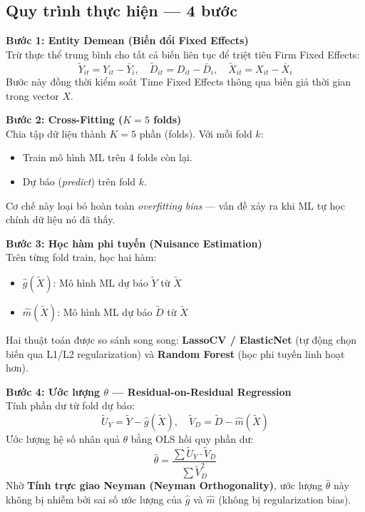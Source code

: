 \documentclass[12pt,a4paper]{article}
\begin{document}
\subsection{Quy trình thực hiện --- 4 bước}
\textbf{Bước 1: Entity Demean (Biến đổi Fixed Effects)} \\
Trừ thực thể trung bình cho tất cả biến liên tục để triệt tiêu Firm Fixed Effects:
\begin{equation}
\tilde{Y}_{it} = Y_{it} - \bar{Y}_i, \quad \tilde{D}_{it} = D_{it} - \bar{D}_i, \quad \tilde{X}_{it} = X_{it} - \bar{X}_i
\end{equation}
Bước này đồng thời kiểm soát Time Fixed Effects thông qua biến giả thời gian trong vector $X$.

\noindent\textbf{Bước 2: Cross-Fitting ($K = 5$ folds)} \\
Chia tập dữ liệu thành $K = 5$ phần (folds). Với mỗi fold $k$:
\begin{itemize}
    \item Train mô hình ML trên 4 folds còn lại.
    \item Dự báo (\textit{predict}) trên fold $k$.
\end{itemize}
Cơ chế này loại bỏ hoàn toàn \textit{overfitting bias} --- vấn đề xảy ra khi ML tự học chính dữ liệu nó đã thấy.

\noindent\textbf{Bước 3: Học hàm phi tuyến (Nuisance Estimation)} \\
Trên từng fold train, học hai hàm:
\begin{itemize}
    \item $\hat{g}(\tilde{X})$: Mô hình ML dự báo $\tilde{Y}$ từ $\tilde{X}$
    \item $\hat{m}(\tilde{X})$: Mô hình ML dự báo $\tilde{D}$ từ $\tilde{X}$
\end{itemize}
Hai thuật toán được so sánh song song: \textbf{LassoCV / ElasticNet} (tự động chọn biến qua L1/L2 regularization) và \textbf{Random Forest} (học phi tuyến linh hoạt hơn).

\noindent\textbf{Bước 4: Ước lượng $\theta$ --- Residual-on-Residual Regression} \\
Tính phần dư từ fold dự báo:
\begin{equation}
\tilde{U}_Y = \tilde{Y} - \hat{g}(\tilde{X}), \quad \tilde{V}_D = \tilde{D} - \hat{m}(\tilde{X})
\end{equation}
Ước lượng hệ số nhân quả $\theta$ bằng OLS hồi quy phần dư:
\begin{equation}
\hat{\theta} = \frac{\sum \tilde{U}_Y \cdot \tilde{V}_D}{\sum \tilde{V}_D^2}
\end{equation}
Nhờ \textbf{Tính trực giao Neyman (Neyman Orthogonality)}, ước lượng $\hat{\theta}$ này không bị nhiễm bởi sai số ước lượng của $\hat{g}$ và $\hat{m}$ (không bị regularization bias).
\end{document}
